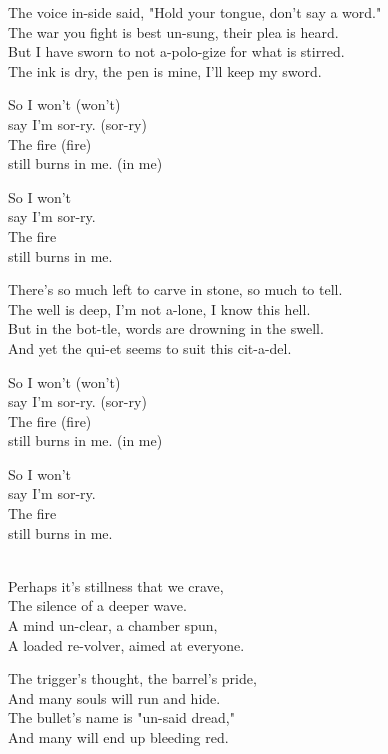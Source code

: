 \begin{lyrics}

The voice in-side said, "Hold your tongue, don't say a word."\\
The war you fight is best un-sung, their plea is heard.\\
But I have sworn to not a-polo-gize for what is stirred.\\
The ink is dry, the pen is mine, I'll keep my sword.

So I won't (won't)\\
say I'm sor-ry. (sor-ry)\\
The fire (fire)\\
still burns in me. (in me)

So I won't\\
say I'm sor-ry.\\
The fire\\
still burns in me.

There's so much left to carve in stone, so much to tell.\\
The well is deep, I'm not a-lone, I know this hell.\\
But in the bot-tle, words are drowning in the swell.\\
And yet the qui-et seems to suit this cit-a-del.

So I won't (won't)\\
say I'm sor-ry. (sor-ry)\\
The fire (fire)\\
still burns in me. (in me)

So I won't\\
say I'm sor-ry.\\
The fire\\
still burns in me.

\\
Perhaps it's stillness that we crave,\\
The silence of a deeper wave.\\
A mind un-clear, a chamber spun,\\
A loaded re-volver, aimed at everyone.

The trigger's thought, the barrel's pride,\\
And many souls will run and hide.\\
The bullet's name is "un-said dread,"\\
And many will end up bleeding red.


\end{lyrics}
